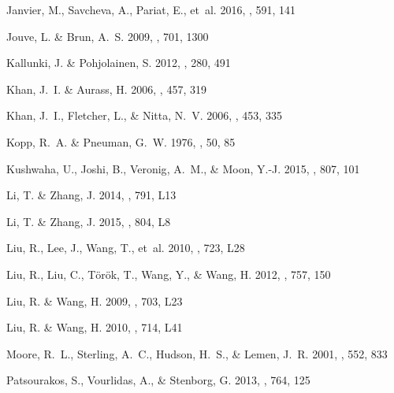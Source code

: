 \documentclass[apj]{emulateapj}
\begin{document}
\begin{thebibliography}{66}
{Janvier}, M., {Savcheva}, A., {Pariat}, E., {et~al.} 2016, \aap, 591, 141

{Jouve}, L. \& {Brun}, A.~S. 2009, \apj, 701, 1300

{Kallunki}, J. \& {Pohjolainen}, S. 2012, \solphys, 280, 491

{Khan}, J.~I. \& {Aurass}, H. 2006, \aap, 457, 319

{Khan}, J.~I., {Fletcher}, L., \& {Nitta}, N.~V. 2006, \aap, 453, 335

{Kopp}, R.~A. \& {Pneuman}, G.~W. 1976, \solphys, 50, 85

{Kushwaha}, U., {Joshi}, B., {Veronig}, A.~M., \& {Moon}, Y.-J. 2015, \apj,
  807, 101

{Li}, T. \& {Zhang}, J. 2014, \apjl, 791, L13

{Li}, T. \& {Zhang}, J. 2015, \apjl, 804, L8

{Liu}, R., {Lee}, J., {Wang}, T., {et~al.} 2010, \apjl, 723, L28

{Liu}, R., {Liu}, C., {T{\"o}r{\"o}k}, T., {Wang}, Y., \& {Wang}, H. 2012,
  \apj, 757, 150

{Liu}, R. \& {Wang}, H. 2009, \apjl, 703, L23

{Liu}, R. \& {Wang}, H. 2010, \apjl, 714, L41

{Moore}, R.~L., {Sterling}, A.~C., {Hudson}, H.~S., \& {Lemen}, J.~R. 2001,
  \apj, 552, 833

{Patsourakos}, S., {Vourlidas}, A., \& {Stenborg}, G. 2013, \apj, 764, 125


\end{thebibliography}
\end{document}
